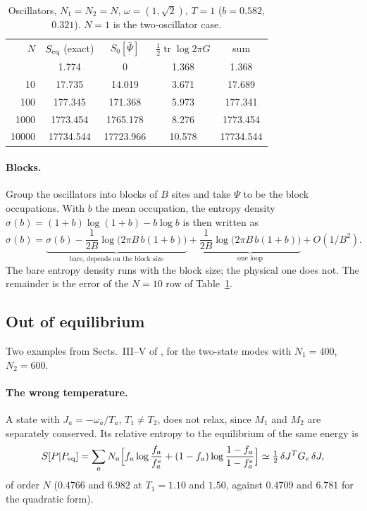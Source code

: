 \documentclass[11pt,aps,preprint,nofootinbib,superscriptaddress,tightenlines]{revtex4-2}
\def\st{\begin{equation}}
\def\stp{\end{equation}}
\def\tr{\operatorname{tr}}
\let\oldparagraph\paragraph
\renewcommand{\paragraph}{\par\bigskip\oldparagraph}
\begin{document}
\begin{table}[h]
\caption{Oscillators, $N_1=N_2=N$, $\omega=(1,\sqrt2)$, $T=1$ ($b=0.582$, $0.321$).  $N=1$ is the two-oscillator case.}
\label{tab:bose}
\begin{ruledtabular}
\begin{tabular}{rcccc}
$N$ & $S_{\rm eq}$ (exact) & $S_0[\bar\Psi]$ & $\tfrac12\tr\log2\pi G$ & sum \\
\colrule
1 & 1.774 & 0 & 1.368 & 1.368 \\
10 & 17.735 & 14.019 & 3.671 & 17.689 \\
100 & 177.345 & 171.368 & 5.973 & 177.341 \\
1000 & 1773.454 & 1765.178 & 8.276 & 1773.454 \\
10000 & 17734.544 & 17723.966 & 10.578 & 17734.544 \\
\end{tabular}
\end{ruledtabular}
\end{table}

\paragraph{Blocks.}  Group the oscillators into blocks of $B$ sites and take $\Psi$ to be the block occupations.  With $b$ the mean
occupation, the entropy density $\sigma(b)=(1+b)\log(1+b)-b\log b$ is then written as
\st
\sigma(b)=\underbrace{\sigma(b)-\frac1{2B}\log\big(2\pi B\,b(1+b)\big)}_{\text{bare, depends on the block size}}
+\underbrace{\frac1{2B}\log\big(2\pi B\,b(1+b)\big)}_{\text{one loop}}+O(1/B^2) .
\label{blocks}
\stp
The bare entropy density runs with the block size; the physical one does not.  The remainder is the error of the $N=10$ row of
Table~\ref{tab:bose}.

\subsection{Out of equilibrium}
\label{sec:noneq}

Two examples from Sects.~III--V of \cite{basar}, for the two-state modes with $N_1=400$, $N_2=600$.

\paragraph{The wrong temperature.}  A state with $J_a=-\omega_a/T_a$, $T_1\neq T_2$, does not relax, since $M_1$ and $M_2$ are separately conserved.
Its relative entropy to the equilibrium of the same energy is
\st
S[P|P_{\rm eq}]=\sum_aN_a\Big[f_a\log\frac{f_a}{f_a^e}+(1-f_a)\log\frac{1-f_a}{1-f_a^e}\Big]\simeq\tfrac12\,\delta J^TG_e\,\delta J ,
\stp
of order $N$ ($0.4766$ and $6.982$ at $T_1=1.10$ and $1.50$, against $0.4709$ and $6.781$ for the quadratic form).
\end{document}
